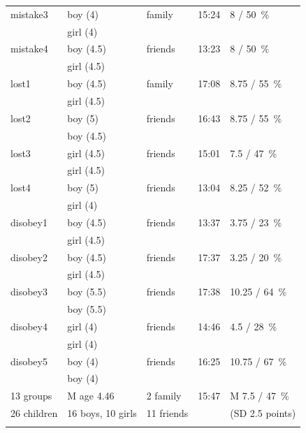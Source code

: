 \documentclass{sig-alternate}
\begin{document}
\begin{table}[H]
\begin{tabular}{lllll}
	mistake3 & boy (4) & family & 15:24 & 8 / 50~\% \\ 
	& girl (4) & & & \\ 
\noalign{\smallskip} \hline \noalign{\smallskip}

	mistake4 & boy (4.5) & friends & 13:23 & 8 / 50~\% \\ 
	& girl (4.5) & & & \\ \noalign{\smallskip} \hline \hline \noalign{\smallskip}

	lost1 & boy (4.5) & family & 17:08 & 8.75 / 55~\% \\ 
	& girl (4.5) & & & \\ \noalign{\smallskip} \hline \noalign{\smallskip}

	lost2 & boy (5) & friends & 16:43 & 8.75 / 55~\% \\
	& boy (4.5) & & & \\  
\noalign{\smallskip} \hline \noalign{\smallskip}

	lost3 & girl (4.5) & friends & 15:01 & 7.5 / 47~\% \\ 
	& girl (4.5) & & &  \\ \noalign{\smallskip} \hline \noalign{\smallskip}

	lost4 & boy (5) & friends & 13:04 & 8.25 / 52~\% \\
	& girl (4) & & & \\ 
\noalign{\smallskip} \hline \hline \noalign{\smallskip}

	disobey1 & boy (4.5) & friends & 13:37 & 3.75 / 23~\% \\
	& girl (4.5) & & & \\ \noalign{\smallskip} \hline \noalign{\smallskip}

	disobey2 & boy (4.5) & friends & 17:37 & 3.25 / 20~\% \\ 
	& girl (4.5) & & & \\ \noalign{\smallskip} \hline \noalign{\smallskip}

	disobey3 & boy (5.5) & friends & 17:38 & 10.25 / 64~\% \\ 
	& boy (5.5) & & & \\ \noalign{\smallskip} \hline \noalign{\smallskip}

	disobey4 & girl (4) & friends & 14:46 & 4.5 / 28~\% \\
	& girl (4) & & & \\ \noalign{\smallskip} \hline \noalign{\smallskip}

	disobey5 & boy (4) & friends & 16:25 & 10.75 / 67~\%  \\
	& boy (4) & & & \\
\noalign{\smallskip} \hline \hline \noalign{\smallskip}
	
	13 groups & M age 4.46 & 2 family & 15:47 & M 7.5 / 47~\% \\ 
	26 children & 16 boys, 10 girls & 11 friends & & (SD 2.5 points) \\	
\noalign{\smallskip}\hline

\end{tabular}
\end{table}	
\end{document}
